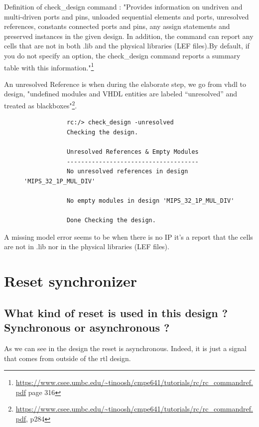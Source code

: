\documentclass[11pt,a4paper,sans,dvipsnames]{report}
\begin{document}
	Definition of check\_design command : "Provides information on undriven and multi-driven ports and pins, unloaded sequential elements and ports, unresolved references, constants connected ports and pins, any assign statements and preserved instances in the given design. In addition, the command can report any cells that are not in both .lib and the physical libraries (LEF files).By default, if you do not specify an option, the check\_design command reports a summary table with this information."\footnote{\url{https://www.csee.umbc.edu/~tinoosh/cmpe641/tutorials/rc/rc_commandref.pdf} page 316}

	\par An unresolved Reference is when during the elaborate step, we go from vhdl to design, "undefined modules and VHDL entities are labeled “unresolved” and treated as blackboxes"\footnote{\url{https://www.csee.umbc.edu/~tinoosh/cmpe641/tutorials/rc/rc_commandref.pdf}, p284}.

	\begin{figure}[h!]
		\centering
		\begin{lstlisting}
			rc:/> check_design -unresolved  
			Checking the design.

			Unresolved References & Empty Modules
			------------------------------------- 
			No unresolved references in design 'MIPS_32_1P_MUL_DIV'

			No empty modules in design 'MIPS_32_1P_MUL_DIV'

			Done Checking the design.
		\end{lstlisting}
		\label{fig:rc_elaborate}
	\end{figure}

	\par A missing model error seems to be when there is no IP it's a report that the cells are not in .lib nor in the physical libraries (LEF files).


	\newpage


	\section{Reset synchronizer}

	\subsection*{ What kind of reset is used in this design ? Synchronous or asynchronous ?}
	\par As we can see in the design the reset is asynchronous. Indeed, it is just a signal that comes from outside of the rtl design.
\end{document}
